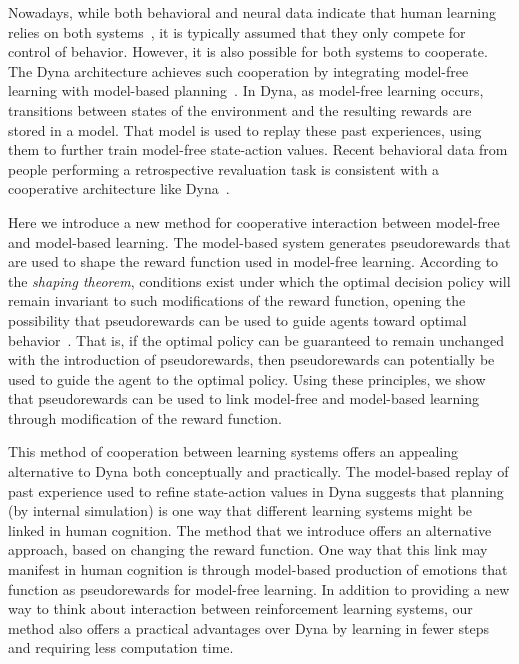 \documentclass[letterpaper]{article}
\begin{document}
Nowadays, while both behavioral and neural data indicate that human learning relies on both systems~\cite{daw2005uncertainty, glascher2010states, dayan2014model}, it is typically assumed that they only compete for control of behavior. However, it is also possible for both systems to cooperate. The Dyna architecture achieves such cooperation by integrating model-free learning with model-based planning~\cite{sutton1991dyna}. In Dyna, as model-free learning occurs, transitions between states of the environment and the resulting rewards are stored in a model. That model is used to replay these past experiences, using them to further train model-free state-action values. Recent behavioral data from people performing a retrospective revaluation task is consistent with a cooperative architecture like Dyna~\cite{gershman2014retrospective}.

Here we introduce a new method for cooperative interaction between model-free and model-based learning. The model-based system generates pseudorewards that are used to shape the reward function used in model-free learning. According to the \textit{shaping theorem}, conditions exist under which the optimal decision policy will remain invariant to such modifications of the reward function, opening the possibility that pseudorewards can be used to guide agents toward optimal behavior~\cite{ng1999policy}. That is, if the optimal policy can be guaranteed to remain unchanged with the introduction of pseudorewards, then pseudorewards can potentially be used to guide the agent to the optimal policy. Using these principles, we show that pseudorewards can be used to link model-free and model-based learning through modification of the reward function.

This method of cooperation between learning systems offers an appealing alternative to Dyna both conceptually and practically. The model-based replay of past experience used to refine state-action values in Dyna suggests that planning (by internal simulation) is one way that different learning systems might be linked in human cognition. The method that we introduce offers an alternative approach, based on changing the reward function. One way that this link may manifest in human cognition is through model-based production of emotions that function as pseudorewards for model-free learning. In addition to providing a new way to think about interaction between reinforcement learning systems, our method also offers a practical advantages over Dyna by learning in fewer steps and requiring less computation time.
\end{document}
